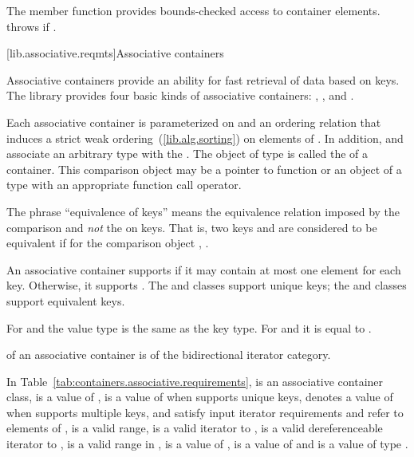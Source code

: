 \pnum
The member function
provides bounds-checked access to container elements.
throws
if
.

[lib.associative.reqmts]{Associative containers}

\pnum
Associative containers provide an ability for fast retrieval of data based on keys.
The library provides four basic kinds of associative containers:
,
,
and
.

\pnum
Each associative container is parameterized on
and an ordering relation
that induces a strict weak ordering~(\ref{lib.alg.sorting}) on
elements of
.
In addition,
and
associate an arbitrary type
with the
.
The object of type
is called the
of a container.
This comparison object may be a pointer to function or an object of a type
with an appropriate function call operator.

\pnum
The phrase ``equivalence of keys'' means the equivalence relation imposed by the
comparison and
\textit{not}
the
on keys.
That is, two keys
and
are considered to be equivalent if for the
comparison object
,
.

\pnum
An associative container supports  if it may contain at
most one element for each key. Otherwise, it supports .
The  and  classes support unique keys; the 
and  classes support equivalent keys.

\pnum
For  and  the value type is the same as the key type.
For  and  it is equal to .

\pnum
{}
of an associative container is of the bidirectional iterator category.

\pnum
In Table~\ref{tab:containers.associative.requirements},
 is an associative container class,
 is a value of ,
 is a value of 
when  supports unique keys,
 denotes a value of 
when  supports multiple keys,
 and 
satisfy input iterator requirements and refer to elements of
, 
is a valid range,
 is a valid iterator to ,
 is a valid dereferenceable iterator to ,
\tcode{[q1, q2)} is a valid range in ,
 is a value of ,
 is a value of 
and  is a value of type .

